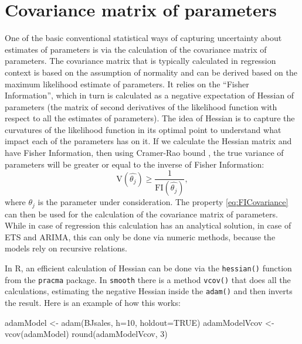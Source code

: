 \documentclass[
]{book}
\newenvironment{Shaded}{\begin{snugshade}}{\end{snugshade}}
\newcommand{\AttributeTok}[1]{\textcolor[rgb]{0.77,0.63,0.00}{#1}}
\newcommand{\ConstantTok}[1]{\textcolor[rgb]{0.00,0.00,0.00}{#1}}
\newcommand{\DecValTok}[1]{\textcolor[rgb]{0.00,0.00,0.81}{#1}}
\newcommand{\FunctionTok}[1]{\textcolor[rgb]{0.00,0.00,0.00}{#1}}
\newcommand{\NormalTok}[1]{#1}
\newcommand{\OtherTok}[1]{\textcolor[rgb]{0.56,0.35,0.01}{#1}}
\theoremstyle{definition}
\theoremstyle{definition}
\theoremstyle{definition}
\theoremstyle{definition}
\theoremstyle{remark}
\begin{document}
\hypertarget{ADAMUncertaintyVCOV}{%
\section{Covariance matrix of parameters}\label{ADAMUncertaintyVCOV}}

One of the basic conventional statistical ways of capturing uncertainty about estimates of parameters is via the calculation of the covariance matrix of parameters. The covariance matrix that is typically calculated in regression context is based on the assumption of normality and can be derived based on the maximum likelihood estimate of parameters. It relies on the ``Fisher Information'', which in turn is calculated as a negative expectation of Hessian of parameters (the matrix of second derivatives of the likelihood function with respect to all the estimates of parameters). The idea of Hessian is to capture the curvatures of the likelihood function in its optimal point to understand what impact each of the parameters has on it. If we calculate the Hessian matrix and have Fisher Information, then using Cramer-Rao bound \citep{WikipediaCramerRaoBound}, the true variance of parameters will be greater or equal to the inverse of Fisher Information:
\begin{equation}
    \mathrm{V}(\hat{\theta_j}) \geq \frac{1}{\mathrm{FI}(\hat{\theta_j})} ,
    \label{eq:FICovariance}
\end{equation}
where \(\theta_j\) is the parameter under consideration. The property \eqref{eq:FICovariance} can then be used for the calculation of the covariance matrix of parameters. While in case of regression this calculation has an analytical solution, in case of ETS and ARIMA, this can only be done via numeric methods, because the models rely on recursive relations.

In R, an efficient calculation of Hessian can be done via the \texttt{hessian()} function from the \texttt{pracma} package. In \texttt{smooth} there is a method \texttt{vcov()} that does all the calculations, estimating the negative Hessian inside the \texttt{adam()} and then inverts the result. Here is an example of how this works:

\begin{Shaded}
\begin{Highlighting}[]
\NormalTok{adamModel }\OtherTok{\textless{}{-}} \FunctionTok{adam}\NormalTok{(BJsales, }\AttributeTok{h=}\DecValTok{10}\NormalTok{, }\AttributeTok{holdout=}\ConstantTok{TRUE}\NormalTok{)}
\NormalTok{adamModelVcov }\OtherTok{\textless{}{-}} \FunctionTok{vcov}\NormalTok{(adamModel)}
\FunctionTok{round}\NormalTok{(adamModelVcov, }\DecValTok{3}\NormalTok{)}
\end{Highlighting}
\end{Shaded}
\end{document}
